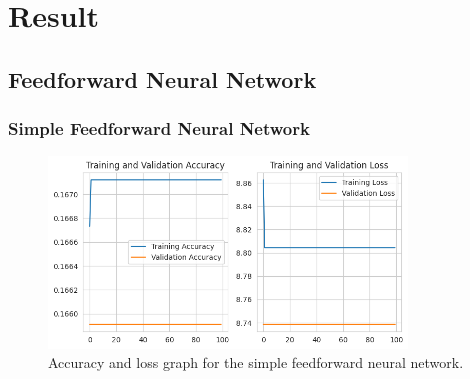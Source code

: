 \section{Result}\label{sec:result}


\subsection{Feedforward Neural Network}\label{subsec:feedforward-neural-network}

\subsubsection{Simple Feedforward Neural Network}

\begin{figure}[ht]
    \centering
    \includegraphics[width=0.85\textwidth]{./img/ffnn/simple/accuracy-loss-graph}
    \caption{Accuracy and loss graph for the simple feedforward neural network.}
    \label{fig:ffnn-simple-accuracy-loss-graph}
\end{figure}

